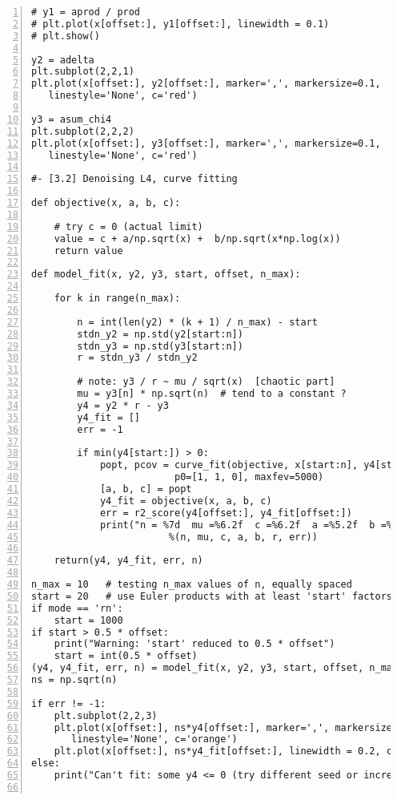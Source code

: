 \documentclass[oneside,10pt]{book}
\begin{document}
\begin{lstlisting}[numbers=left]
# y1 = aprod / prod
# plt.plot(x[offset:], y1[offset:], linewidth = 0.1)
# plt.show()

y2 = adelta 
plt.subplot(2,2,1)
plt.plot(x[offset:], y2[offset:], marker=',', markersize=0.1, 
   linestyle='None', c='red')

y3 = asum_chi4 
plt.subplot(2,2,2)
plt.plot(x[offset:], y3[offset:], marker=',', markersize=0.1, 
   linestyle='None', c='red')

#- [3.2] Denoising L4, curve fitting

def objective(x, a, b, c):

    # try c = 0 (actual limit)
    value = c + a/np.sqrt(x) +  b/np.sqrt(x*np.log(x)) 
    return value

def model_fit(x, y2, y3, start, offset, n_max):
   
    for k in range(n_max):

        n = int(len(y2) * (k + 1) / n_max) - start  
        stdn_y2 = np.std(y2[start:n])
        stdn_y3 = np.std(y3[start:n])
        r = stdn_y3 / stdn_y2
        
        # note: y3 / r ~ mu / sqrt(x)  [chaotic part]
        mu = y3[n] * np.sqrt(n)  # tend to a constant ?
        y4 = y2 * r - y3
        y4_fit = []
        err = -1

        if min(y4[start:]) > 0: 
            popt, pcov = curve_fit(objective, x[start:n], y4[start:n], 
                         p0=[1, 1, 0], maxfev=5000)
            [a, b, c] = popt
            y4_fit = objective(x, a, b, c)
            err = r2_score(y4[offset:], y4_fit[offset:])
            print("n = %7d  mu =%6.2f  c =%6.2f  a =%5.2f  b =%5.2f  r =%6.3f  err =%6.3f"
                        %(n, mu, c, a, b, r, err))

    return(y4, y4_fit, err, n)

n_max = 10   # testing n_max values of n, equally spaced
start = 20   # use Euler products with at least 'start' factors 
if mode == 'rn':
    start = 1000
if start > 0.5 * offset:
    print("Warning: 'start' reduced to 0.5 * offset")
    start = int(0.5 * offset)
(y4, y4_fit, err, n) = model_fit(x, y2, y3, start, offset, n_max)
ns = np.sqrt(n)

if err != -1:
    plt.subplot(2,2,3)
    plt.plot(x[offset:], ns*y4[offset:], marker=',', markersize=0.1, 
       linestyle='None', c='orange')
    plt.plot(x[offset:], ns*y4_fit[offset:], linewidth = 0.2, c='black')
else:
    print("Can't fit: some y4 <= 0 (try different seed or increase 'start')")


\end{lstlisting}
\end{document}
